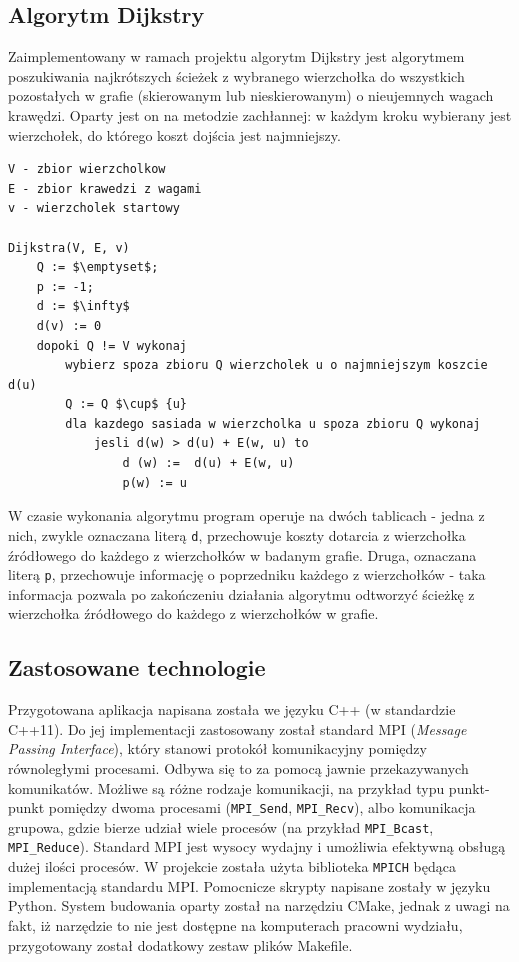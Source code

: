 \documentclass[12pt]{article}
\begin{document}
\subsection{Algorytm Dijkstry}
Zaimplementowany w ramach projektu algorytm Dijkstry jest algorytmem poszukiwania najkrótszych ścieżek z wybranego wierzchołka do wszystkich pozostałych w grafie (skierowanym lub nieskierowanym) o nieujemnych wagach krawędzi. Oparty jest on na metodzie zachłannej: w każdym kroku wybierany jest wierzchołek, do którego koszt dojścia jest najmniejszy. 

\begin{lstlisting}[caption={Pseudokod algorytmu Dijkstry.}, captionpos=b, mathescape=true, basicstyle=\scriptsize]
V - zbior wierzcholkow
E - zbior krawedzi z wagami
v - wierzcholek startowy

Dijkstra(V, E, v)
    Q := $\emptyset$;
    p := -1;
    d := $\infty$
    d(v) := 0
    dopoki Q != V wykonaj
        wybierz spoza zbioru Q wierzcholek u o najmniejszym koszcie d(u)
        Q := Q $\cup$ {u}
        dla kazdego sasiada w wierzcholka u spoza zbioru Q wykonaj
            jesli d(w) > d(u) + E(w, u) to
                d (w) :=  d(u) + E(w, u)
                p(w) := u
\end{lstlisting}

W czasie wykonania algorytmu program operuje na dwóch tablicach - jedna z nich, zwykle oznaczana literą \lstinline{d}, przechowuje koszty dotarcia z wierzchołka źródłowego do każdego z wierzchołków w badanym grafie. Druga, oznaczana literą \lstinline{p}, przechowuje informację o poprzedniku każdego z wierzchołków - taka informacja pozwala po zakończeniu działania algorytmu odtworzyć ścieżkę z wierzchołka źródłowego do każdego z wierzchołków w grafie.

\subsection{Zastosowane technologie}
Przygotowana aplikacja napisana została we języku C++ (w standardzie C++11). Do jej implementacji zastosowany został standard MPI (\textit{Message Passing Interface}), który stanowi protokół komunikacyjny pomiędzy równoległymi procesami. Odbywa się to za pomocą jawnie przekazywanych komunikatów. Możliwe są różne rodzaje komunikacji, na przykład typu punkt-punkt pomiędzy dwoma procesami (\lstinline|MPI_Send|, \lstinline|MPI_Recv|), albo komunikacja grupowa, gdzie bierze udział wiele procesów (na przykład \lstinline|MPI_Bcast|, \lstinline|MPI_Reduce|). Standard MPI jest wysocy wydajny i umożliwia efektywną obsługą dużej ilości procesów. W projekcie została użyta biblioteka \lstinline|MPICH| będąca implementacją standardu MPI. Pomocnicze skrypty napisane zostały w języku Python. System budowania oparty został na narzędziu CMake, jednak z uwagi na fakt, iż narzędzie to nie jest dostępne na komputerach pracowni wydziału, przygotowany został dodatkowy zestaw plików Makefile.
\end{document}
